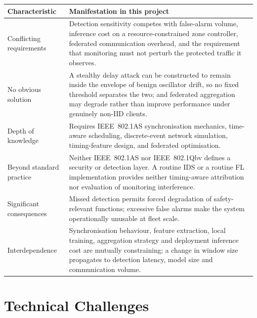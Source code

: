 \begin{longtable}{p{} p{}}
\toprule
\textbf{Characteristic} & \textbf{Manifestation in this project} \\
\midrule
\endhead
Conflicting requirements &
Detection sensitivity competes with false-alarm volume, inference cost on a
resource-constrained zone controller, federated communication overhead, and the
requirement that monitoring must not perturb the protected traffic it observes. \\
\addlinespace
No obvious solution &
A stealthy delay attack can be constructed to remain inside the envelope of benign
oscillator drift, so no fixed threshold separates the two; and federated aggregation
may degrade rather than improve performance under genuinely non-IID clients. \\
\addlinespace
Depth of knowledge &
Requires IEEE~802.1AS synchronisation mechanics, time-aware scheduling, discrete-event
network simulation, timing-feature design, and federated optimisation. \\
\addlinespace
Beyond standard practice &
Neither IEEE~802.1AS nor IEEE~802.1Qbv defines a security or detection layer. A
routine IDS or a routine FL implementation provides neither timing-aware attribution
nor evaluation of monitoring interference. \\
\addlinespace
Significant consequences &
Missed detection permits forced degradation of safety-relevant functions; excessive
false alarms make the system operationally unusable at fleet scale. \\
\addlinespace
Interdependence &
Synchronisation behaviour, feature extraction, local training, aggregation strategy
and deployment inference cost are mutually constraining; a change in window size
propagates to detection latency, model size and communication volume. \\
\bottomrule
\end{longtable}

\section{Technical Challenges}
\label{sec:technical-challenges}

